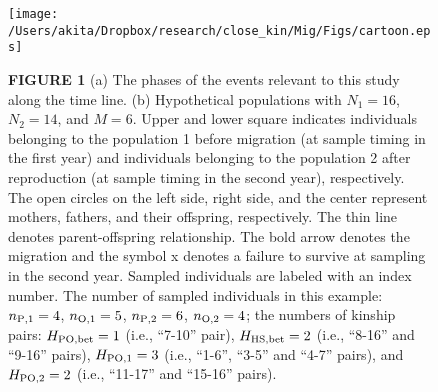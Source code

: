 \documentclass[12pt, English]{article}
\begin{document}
\begin{spacing}{1.9}
\clearpage

\newcommand{\figcapa}{(a) The phases of the events relevant to this study along the time line. (b) Hypothetical populations with $N_{1}=16$, $N_{2}=14$, and $M=6$. Upper and lower square indicates individuals belonging to the population 1 before migration (at sample timing in the first year) and individuals belonging to the population 2 after reproduction (at sample timing in the second year), respectively. The open circles on the left side, right side, and the center represent mothers, fathers, and their offspring, respectively. The thin line denotes parent-offspring relationship. The bold arrow denotes the migration and the symbol x denotes a failure to survive at sampling in the second year. Sampled individuals are labeled with an index number. The number of sampled individuals in this example: $n_{\rm P, 1}=4$, $n_{\rm O, 1}=5$, $n_{\rm P, 2}=6$, $n_{\rm O, 2}=4$; the numbers of kinship pairs: $H_{\rm PO, bet}=1$ (i.e., ``7-10'' pair), $H_{\rm HS, bet}=2$ (i.e., ``8-16'' and ``9-16'' pairs), $H_{\rm PO, 1}=3$ (i.e., ``1-6'', ``3-5'' and ``4-7'' pairs), and $H_{\rm PO, 2}=2$ (i.e., ``11-17'' and ``15-16'' pairs).}

\newcommand{\figcapb}{Violin plots showing the distribution of relative bias in our estimator (Eq.~\ref{NeN_hat2}) for various values of $c$ and sample size. Filled circles represent the mean values. Sample sizes for mothers and offspring are identical (i.e., $n=n_{\rm M} = n_{\rm O}$) and indicated in the legend. For the demonstration purposes, the distribution is truncated, although the mean values are calculated including the truncated values. (a) $N_{\rm m}=1{,}000$, (b) $N_{\rm m}=10{,}000$.}

\newcommand{\figcapsg}{Violin plots showing the distribution of relative bias of $N_{\rm e}/N$ (denoted in Eq.~\ref{NeN_wang}) for various sample sizes. Filled circles represent the mean values. The sample numbers of parents and offspring are identical (i.e., $n=n_{\rm P} = n_{\rm O}$) and indicated in the legend. For demonstration purposes, the distribution is truncated, although the mean values are calculated including the truncated values. (a) $N=2{,}000$, (b) $N=20{,}000$.}

\begin{figure}[!h]
	\begin{center}
		\texttt{[image: /Users/akita/Dropbox/research/close\_kin/Mig/Figs/cartoon.eps]}
		\caption{{\bf FIGURE 1} \figcapa{}}
		\label{cartoon}
	\end{center}
\end{figure}


\end{spacing}
\end{document}

